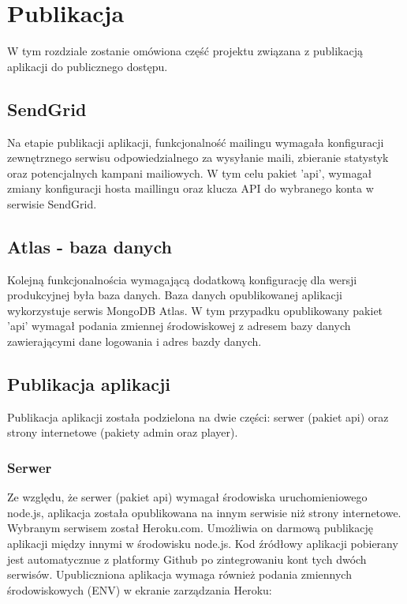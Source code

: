 \chapter{Publikacja}
\label{ch:funplenop}

W tym rozdziale zostanie omówiona część projektu związana z publikacją aplikacji do publicznego dostępu.

\section{SendGrid}
Na etapie publikacji aplikacji, funkcjonalność mailingu wymagała konfiguracji zewnętrznego serwisu odpowiedzialnego za wysyłanie maili, zbieranie statystyk oraz potencjalnych kampani mailiowych. W tym celu pakiet 'api', wymagał zmiany konfiguracji hosta maillingu oraz klucza API do wybranego konta w serwisie SendGrid.

\section{Atlas - baza danych}
Kolejną funkcjonalnościa wymagającą dodatkową konfigurację dla wersji produkcyjnej była baza danych. Baza danych opublikowanej aplikacji wykorzystuje serwis MongoDB Atlas. W tym przypadku opublikowany pakiet 'api' wymagał podania zmiennej środowiskowej z adresem bazy danych zawierającymi dane logowania i adres bazdy danych.

\section{Publikacja aplikacji}
Publikacja aplikacji została podzielona na dwie części: serwer (pakiet api) oraz strony internetowe (pakiety admin oraz player).

\subsection{Serwer}
Ze względu, że serwer (pakiet api) wymagał środowiska uruchomieniowego node.js, aplikacja została opublikowana na innym serwisie niż strony internetowe. Wybranym serwisem został Heroku.com. Umożliwia on darmową publikację aplikacji między innymi w środowisku node.js. Kod źródłowy aplikacji pobierany jest automatycznue z platformy Github po zintegrowaniu kont tych dwóch serwisów. Upubliczniona aplikacja wymaga również podania zmiennych środowiskowych (ENV) w ekranie zarządzania Heroku:

